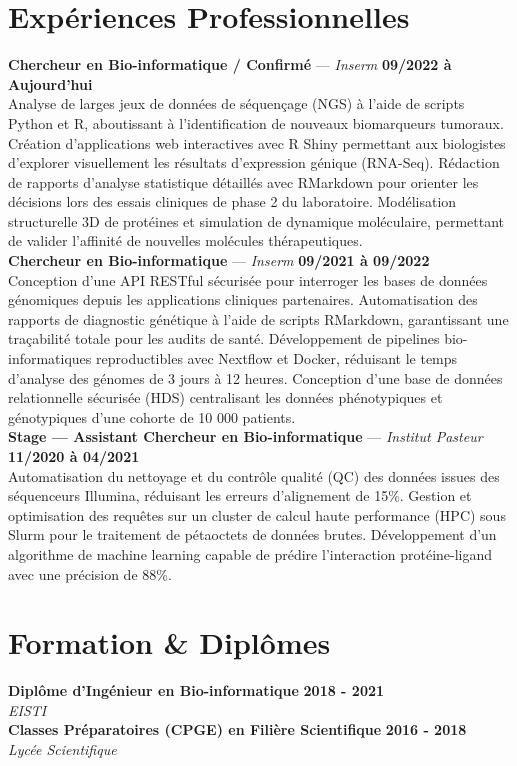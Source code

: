 \documentclass[11pt,a4paper]{article}
\begin{document}
\section*{Expériences Professionnelles}
\noindent \textbf{Chercheur en Bio-informatique / Confirmé} --- \textit{Inserm} \hfill \textbf{09/2022 à Aujourd'hui} \\
Analyse de larges jeux de données de séquençage (NGS) à l'aide de scripts Python et R, aboutissant à l'identification de nouveaux biomarqueurs tumoraux. Création d'applications web interactives avec R Shiny permettant aux biologistes d'explorer visuellement les résultats d'expression génique (RNA-Seq). Rédaction de rapports d'analyse statistique détaillés avec RMarkdown pour orienter les décisions lors des essais cliniques de phase 2 du laboratoire. Modélisation structurelle 3D de protéines et simulation de dynamique moléculaire, permettant de valider l'affinité de nouvelles molécules thérapeutiques. \\[0.3cm]
\noindent \textbf{Chercheur en Bio-informatique} --- \textit{Inserm} \hfill \textbf{09/2021 à 09/2022} \\
Conception d'une API RESTful sécurisée pour interroger les bases de données génomiques depuis les applications cliniques partenaires. Automatisation des rapports de diagnostic génétique à l'aide de scripts RMarkdown, garantissant une traçabilité totale pour les audits de santé. Développement de pipelines bio-informatiques reproductibles avec Nextflow et Docker, réduisant le temps d'analyse des génomes de 3 jours à 12 heures. Conception d'une base de données relationnelle sécurisée (HDS) centralisant les données phénotypiques et génotypiques d'une cohorte de 10 000 patients. \\[0.3cm]
\noindent \textbf{Stage — Assistant Chercheur en Bio-informatique} --- \textit{Institut Pasteur} \hfill \textbf{11/2020 à 04/2021} \\
Automatisation du nettoyage et du contrôle qualité (QC) des données issues des séquenceurs Illumina, réduisant les erreurs d'alignement de 15\%. Gestion et optimisation des requêtes sur un cluster de calcul haute performance (HPC) sous Slurm pour le traitement de pétaoctets de données brutes. Développement d'un algorithme de machine learning capable de prédire l'interaction protéine-ligand avec une précision de 88\%. \\[0.3cm]


\vspace{0.3cm}

\section*{Formation \& Diplômes}
\noindent \textbf{Diplôme d'Ingénieur en Bio-informatique} \hfill \textbf{2018 - 2021} \\
\textit{EISTI} \\[0.3cm]
\noindent \textbf{Classes Préparatoires (CPGE) en Filière Scientifique} \hfill \textbf{2016 - 2018} \\
\textit{Lycée Scientifique} \\[0.3cm]
\end{document}
